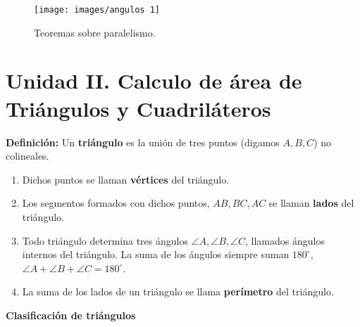 \begin{figure}[htb]
    \centering
    \label{fig:teoremas-paralelismot}
    \texttt{[image: images/angulos 1]}
    \caption{Teoremas sobre paralelismo.}
\end{figure}





\section{\large Unidad II. Calculo de área de Triángulos y Cuadriláteros}

\textbf{Definición:} Un \textbf{triángulo} es la unión de tres puntos (digamos $A, B, C$) no colineales.

\begin{enumerate}
    \item Dichos puntos se llaman \textbf{vértices} del triángulo.
    \item Los segmentos formados con dichos puntos, $AB, BC, AC$ se llaman \textbf{lados} del triángulo.
    \item Todo triángulo determina tres ángulos $\angle A, \angle B, \angle C$, llamados ángulos internos del triángulo.
    La suma de los ángulos siempre suman $180^\circ$, $\angle A + \angle B + \angle C = 180^\circ$.
    \item La suma de los lados de un triángulo se llama \textbf{perímetro} del triángulo.
\end{enumerate}


\textbf{Clasificación de triángulos}

